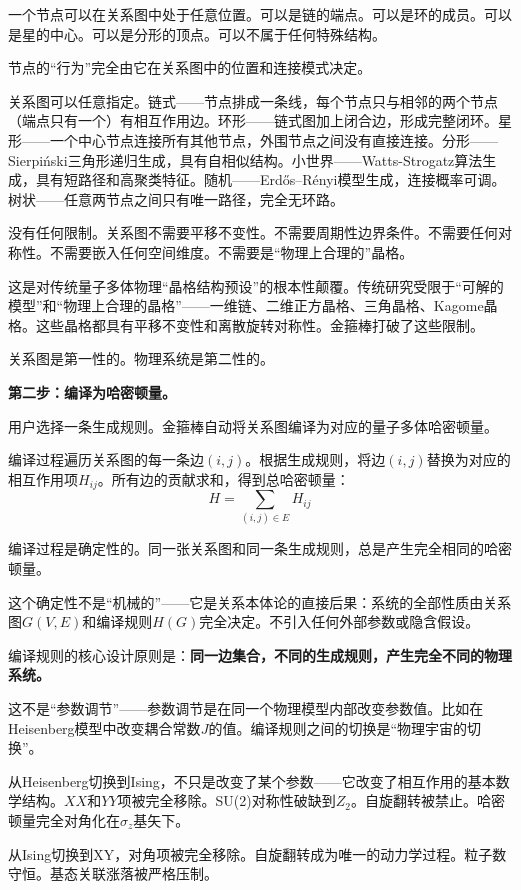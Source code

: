 \documentclass[11pt,a4paper]{book}
\theoremstyle{definition}
\begin{document}
一个节点可以在关系图中处于任意位置。可以是链的端点。可以是环的成员。可以是星的中心。可以是分形的顶点。可以不属于任何特殊结构。

节点的“行为”完全由它在关系图中的位置和连接模式决定。

关系图可以任意指定。链式——节点排成一条线，每个节点只与相邻的两个节点（端点只有一个）有相互作用边。环形——链式图加上闭合边，形成完整闭环。星形——一个中心节点连接所有其他节点，外围节点之间没有直接连接。分形——Sierpiński三角形递归生成，具有自相似结构。小世界——Watts-Strogatz算法生成，具有短路径和高聚类特征。随机——Erdős–Rényi模型生成，连接概率可调。树状——任意两节点之间只有唯一路径，完全无环路。

没有任何限制。关系图不需要平移不变性。不需要周期性边界条件。不需要任何对称性。不需要嵌入任何空间维度。不需要是“物理上合理的”晶格。

这是对传统量子多体物理“晶格结构预设”的根本性颠覆。传统研究受限于“可解的模型”和“物理上合理的晶格”——一维链、二维正方晶格、三角晶格、Kagome晶格。这些晶格都具有平移不变性和离散旋转对称性。金箍棒打破了这些限制。

关系图是第一性的。物理系统是第二性的。

\textbf{第二步：编译为哈密顿量。}

用户选择一条生成规则。金箍棒自动将关系图编译为对应的量子多体哈密顿量。

编译过程遍历关系图的每一条边$(i,j)$。根据生成规则，将边$(i,j)$替换为对应的相互作用项$H_{ij}$。所有边的贡献求和，得到总哈密顿量：
\begin{equation}
H = \sum_{(i,j) \in E} H_{ij}
\end{equation}

编译过程是确定性的。同一张关系图和同一条生成规则，总是产生完全相同的哈密顿量。

这个确定性不是“机械的”——它是关系本体论的直接后果：系统的全部性质由关系图$G(V,E)$和编译规则$H(G)$完全决定。不引入任何外部参数或隐含假设。

编译规则的核心设计原则是：\textbf{同一边集合，不同的生成规则，产生完全不同的物理系统。}

这不是“参数调节”——参数调节是在同一个物理模型内部改变参数值。比如在Heisenberg模型中改变耦合常数$J$的值。编译规则之间的切换是“物理宇宙的切换”。

从Heisenberg切换到Ising，不只是改变了某个参数——它改变了相互作用的基本数学结构。$XX$和$YY$项被完全移除。SU(2)对称性破缺到$Z_2$。自旋翻转被禁止。哈密顿量完全对角化在$\sigma_z$基矢下。

从Ising切换到XY，对角项被完全移除。自旋翻转成为唯一的动力学过程。粒子数守恒。基态关联涨落被严格压制。
\end{document}
